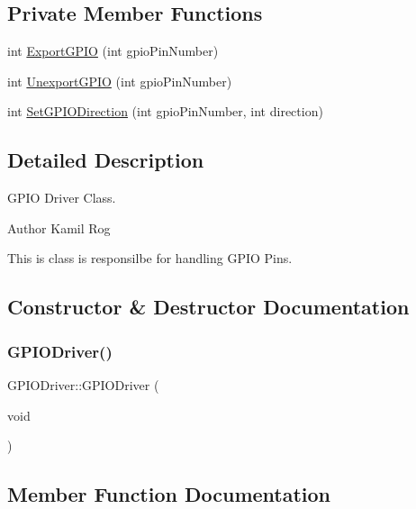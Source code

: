 \subsection*{Private Member Functions}
\begin{DoxyCompactItemize}
\item 
int \hyperlink{classGPIODriver_a5e480dbffe553649faaa457579c7e847}{Export\+G\+P\+IO} (int gpio\+Pin\+Number)
\item 
int \hyperlink{classGPIODriver_a28f9117bc71b9cde6c2d27f896ab7251}{Unexport\+G\+P\+IO} (int gpio\+Pin\+Number)
\item 
int \hyperlink{classGPIODriver_a9e694366a04bc8662865ea758a74eabe}{Set\+G\+P\+I\+O\+Direction} (int gpio\+Pin\+Number, int direction)
\end{DoxyCompactItemize}


\subsection{Detailed Description}
G\+P\+IO Driver Class. 

\begin{DoxyAuthor}{Author}
Kamil Rog
\end{DoxyAuthor}
This is class is responsilbe for handling G\+P\+IO Pins. 

\subsection{Constructor \& Destructor Documentation}
\mbox{\label{classGPIODriver_a74b0f69ce300c94de3d4fdd75042dec3}} 
\subsubsection{\texorpdfstring{G\+P\+I\+O\+Driver()}{GPIODriver()}}
{\footnotesize\ttfamily G\+P\+I\+O\+Driver\+::\+G\+P\+I\+O\+Driver (\begin{DoxyParamCaption}\item[{void}]{ }\end{DoxyParamCaption})\hspace{0.3cm}{\ttfamily [inline]}}



\subsection{Member Function Documentation}
\mbox{\label{classGPIODriver_a5e480dbffe553649faaa457579c7e847}} 
